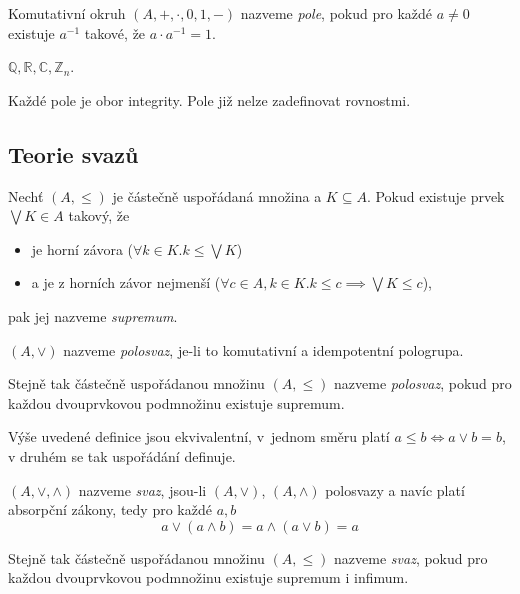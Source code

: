 \begin{definition}[Pole]
Komutativní okruh $(A, +, \cdot, 0, 1, -)$ nazveme {\em pole}, pokud
pro každé $a \neq 0$ existuje $a^{-1}$ takové, že $a \cdot a^{-1} = 1$.
\end{definition}

\begin{example}
    $\mathbb{Q}, \mathbb{R}, \mathbb{C}, \mathbb{Z}_n.$
\end{example}

Každé pole je obor integrity. Pole již nelze zadefinovat rovnostmi.

\subsection{Teorie svazů}

\begin{definition}[Supremum]
    Nechť $(A, \leq)$ je částečně uspořádaná množina
    a $K \subseteq A$. Pokud existuje prvek $\bigvee K \in A$ takový,
    že
    \begin{itemize}
        \item je horní závora ($\forall k \in K . k \leq \bigvee K$)
        \item a je z horních závor nejmenší
    ($\forall c \in A, k \in K . k \leq c \implies \bigvee K \leq c$),
    \end{itemize}
    pak jej nazveme {\em supremum}.
\end{definition}

\begin{definition}[Polosvaz]
    $(A, \vee)$ nazveme {\em polosvaz}, je-li to komutativní a
    idempotentní pologrupa.

    Stejně tak částečně uspořádanou množinu $(A, \leq)$ nazveme
    {\em polosvaz}, pokud pro každou dvouprvkovou podmnožinu existuje supremum.
\end{definition}

Výše uvedené definice jsou ekvivalentní, v~jednom směru platí
$a \leq b \iff a \vee b = b$, v druhém se tak uspořádání definuje.

\begin{definition}[Svaz]
    $(A, \vee, \wedge)$ nazveme {\em svaz}, jsou-li
    $(A, \vee)$, $(A, \wedge)$ polosvazy a navíc platí absorpční zákony,
    tedy pro každé $a, b$
    \[ a \vee (a \wedge b) = a \wedge (a \vee b) = a \]

    Stejně tak částečně uspořádanou množinu $(A, \leq)$ nazveme
    {\em svaz}, pokud pro každou dvouprvkovou podmnožinu existuje
    supremum i infimum.
\end{definition}

